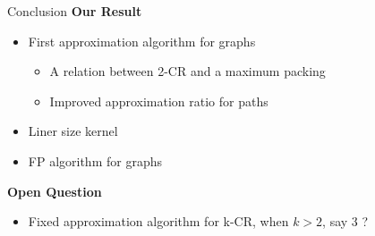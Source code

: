 \begin{frame}{Conclusion}
\textbf{Our Result}
	\pause
	\begin{itemize}
	\item First approximation algorithm for graphs
		\begin{itemize}
		\pause\item
		A relation between 2-CR and a maximum packing 
		
		\pause\item
		Improved approximation ratio for paths 
		\end{itemize}
	
	\pause\item
	Liner size kernel
	
	\pause\item
	FP algorithm for graphs
	
	\end{itemize}

\textbf{Open Question}
	\pause
	\begin{itemize}
	\item
	Fixed approximation algorithm for k-CR, when $k > 2$, say 3 ?
	\end{itemize}

\end{frame}